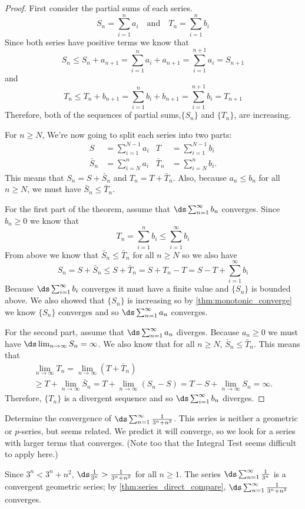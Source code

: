 \begin{proof}
First consider the partial sums of each series.
\[S_n=\sum_{i=1}^n a_i \quad \text{and} \quad T_n=\sum_{i=1}^n b_i\]
Since both series have positive terms we know that
\[S_n\leq S_n+a_{n+1}=\sum_{i=1}^n a_i+a_{n+1}=\sum_{i=1}^{n+1} a_i=S_{n+1}\]
and
\[T_n\leq T_n+b_{n+1}=\sum_{i=1}^n b_i+b_{n+1}=\sum_{i=1}^{n+1} b_i=T_{n+1}\]
Therefore, both of the sequences of partial sums,$\{S_n\}$ and $\{T_n\}$, are increasing.

For $n\ge N$, We're now going to split each series into two parts:
\begin{align*}
S&=\sum_{i=1}^{N-1}a_i & T&=\sum_{i=1}^{N-1}b_i \\
\bar S_n&=\sum_{i=N}^n a_i & \bar T_n&=\sum_{i=N}^n b_i.
\end{align*}
This means that $S_n=S+\bar S_n$ and $T_n=T+\bar T_n$.
Also, because $a_n\leq b_n$ for all $n\geq N$, we must have $\bar S_n\leq\bar T_n$.

For the first part of the theorem, assume that $\ds \sum_{n=1}^\infty b_n$ converges. Since $b_n\geq 0$ we know that 
\[T_n=\sum_{i=1}^n b_i\leq \sum_{i=1}^\infty b_i\]
From above we know that $\bar S_n\leq\bar T_n$ for all $n\geq N$ so we also have
\[S_n=S+\bar S_n\le S+\bar T_n=S+T_n-T=S-T+\sum_{i=1}^\infty b_i\]
Because $\ds \sum_{i=1}^\infty b_i$ converges it must have a finite value and $\{S_n\}$ is bounded above. We also showed that $\{S_n\}$ is increasing so by \autoref{thm:monotonic_converge} we know $\{S_n\}$ converges and so $\ds \sum_{n=1}^\infty a_n$ converges.

For the second part, assume that $\ds\sum_{n=1}^\infty a_n$ diverges. Because $a_n\geq 0$ we must have $\ds\lim_{n\to\infty} S_n=\infty$. We also know that for all $n\ge N$, $\bar S_n\leq\bar T_n$.  This means that
\begin{multline*}
\lim_{n\to \infty} T_n=\lim_{n\to \infty}(T+\bar T_n)\\
\ge T+\lim_{n\to \infty}\bar S_n=T+\lim_{n\to \infty}(S_n-S)
=T-S+\lim_{n\to \infty}S_n=\infty.
\end{multline*}
Therefore, $\{T_n\}$ is a divergent sequence and so $\ds \sum_{i=1}^\infty b_n$ diverges.
\end{proof}


\begin{example}\label{ex_dct1}
Determine the convergence of $\ds\sum_{n=1}^\infty \frac1{3^n+n^2}$.
\solution
This series is neither a geometric or $p$-series, but seems related. We predict it will converge, so we look for a series with larger terms that converges. (Note too that the Integral Test seems difficult to apply here.)

Since $3^n < 3^n+n^2$, $\ds \frac1{3^n}> \frac1{3^n+n^2}$ for all $n\geq1$. The series $\ds\sum_{n=1}^\infty \frac{1}{3^n}$ is a convergent geometric series; by \autoref{thm:series_direct_compare}, $\ds \sum_{n=1}^\infty \frac1{3^n+n^2}$ converges.
\end{example}

